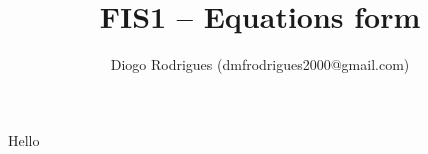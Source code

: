 \documentclass{form}
\author{Diogo Rodrigues (dmfrodrigues2000@gmail.com)}
\title{FIS1 -- Equations form}
\begin{document}
Hello
\end{document}
